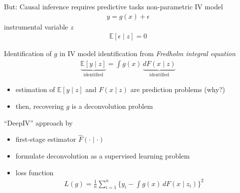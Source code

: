 \documentclass[xcolor=dvipsnames, handout]{beamer}
\newcommand{\E}{\mathbb{E}}
\begin{document}
\begin{frame}{But: Causal inference requires predictive tasks}
non-parametric IV model \parencite{newey2003instrumental}
\begin{align*}
  y = g(x) + \epsilon
\end{align*}
instrumental variable $z$ 
\begin{align*}
  \E[\epsilon \mid z] = 0
\end{align*}
\end{frame}


\begin{frame}{Identification of $g$ in IV model}
identification from \emph{Fredholm integral equation}
\begin{align*}
  \underbrace{\E[y \mid z]}_{\text{identified}} = \int g(x) \, \underbrace{dF(x \mid z)}_{\text{identified}}
\end{align*}
\begin{itemize}
  \item estimation of $\E[y \mid z]$ and $F(x \mid z)$ are prediction problems (why?)
  \item then, recovering $g$ is a deconvolution problem
\end{itemize}
\end{frame}


\begin{frame}{``DeepIV'' approach by \textcite{hartford2017deep}}
\begin{itemize}
  \item first-stage estimator $\hat{F}(\cdot \mid \cdot)$
  \item formulate deconvolution as a supervised learning problem
  \item loss function
  \begin{align*}
    L(g) = \frac{1}{n} \sum_{i=1}^n \Big\{
      y_i - \int g(x) \, dF(x \mid z_i)
    \Big\}^2 
  \end{align*}
\end{itemize}
\end{frame}
\end{document}
